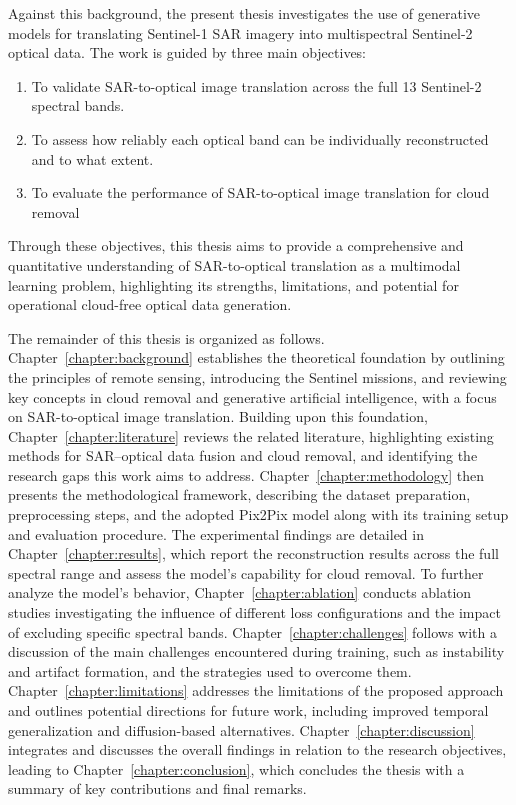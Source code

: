 Against this background, the present thesis investigates the use of generative models for translating Sentinel-1 SAR imagery into multispectral Sentinel-2 optical data. The work is guided by three main objectives:
\begin{enumerate}
    \item To validate SAR-to-optical image translation across the full 13 Sentinel-2 spectral bands. 
    \item To assess how reliably each optical band can be individually reconstructed and to what extent.
    \item To evaluate the performance of SAR-to-optical image translation for cloud removal
\end{enumerate}

Through these objectives, this thesis aims to provide a comprehensive and quantitative understanding of SAR-to-optical translation as a multimodal learning problem, highlighting its strengths, limitations, and potential for operational cloud-free optical data generation.

\bigskip
The remainder of this thesis is organized as follows. Chapter~\ref{chapter:background} establishes the theoretical foundation by outlining the principles of remote sensing, introducing the Sentinel missions, and reviewing key concepts in cloud removal and generative artificial intelligence, with a focus on SAR-to-optical image translation. Building upon this foundation, Chapter~\ref{chapter:literature} reviews the related literature, highlighting existing methods for SAR–optical data fusion and cloud removal, and identifying the research gaps this work aims to address. Chapter~\ref{chapter:methodology} then presents the methodological framework, describing the dataset preparation, preprocessing steps, and the adopted Pix2Pix model along with its training setup and evaluation procedure. The experimental findings are detailed in Chapter~\ref{chapter:results}, which report the reconstruction results across the full spectral range and assess the model’s capability for cloud removal. To further analyze the model’s behavior, Chapter~\ref{chapter:ablation} conducts ablation studies investigating the influence of different loss configurations and the impact of excluding specific spectral bands. Chapter~\ref{chapter:challenges} follows with a discussion of the main challenges encountered during training, such as instability and artifact formation, and the strategies used to overcome them. Chapter~\ref{chapter:limitations} addresses the limitations of the proposed approach and outlines potential directions for future work, including improved temporal generalization and diffusion-based alternatives. Chapter~\ref{chapter:discussion} integrates and discusses the overall findings in relation to the research objectives, leading to Chapter~\ref{chapter:conclusion}, which concludes the thesis with a summary of key contributions and final remarks.